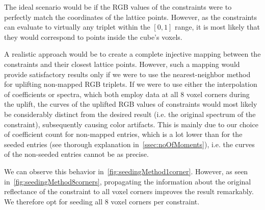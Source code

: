 The ideal scenario would be if the RGB values of the constraints were to perfectly match the coordinates of the lattice points. However, as the constraints can evaluate to virtually any triplet within the $[0,1]$ range, it is most likely that they would correspond to points inside the cube's voxels.

A realistic approach would be to create a complete injective mapping between the constraints and their closest lattice points. However, such a mapping would provide satisfactory results only if we were to use the nearest-neighbor method for uplifting non-mapped RGB triplets. If we were to use either the interpolation of coefficients or spectra, which both employ data at all 8 voxel corners during the uplift, the curves of the uplifted RGB values of constraints would most likely be considerably distinct from the desired result (i.e. the original spectrum of the constraint), subsequently causing color artifacts. This is mainly due to our choice of coefficient count for non-mapped entries, which is a lot lower than for the seeded entries (see thorough explanation in~\cref{ssec:noOfMoments}), i.e. the curves of the non-seeded entries cannot be as precise.

We can observe this behavior in~\cref{fig:seedingMethod1corner}. However, as seen in~\cref{fig:seedingMethod8corners}, propagating the information about the original reflectance of the constraint to all voxel corners improves the result remarkably. We therefore opt for seeding all 8 voxel corners per constraint.


